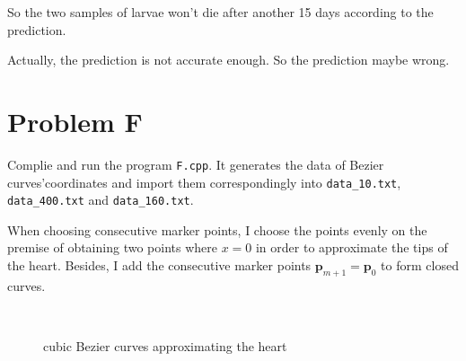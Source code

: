 \documentclass[a4paper]{article}
\begin{document}
So the two samples of larvae won't die after another 15 days according to the prediction.

Actually, the prediction is not accurate enough. So the prediction maybe wrong. 

\section*{Problem F}
Complie and run the program \verb|F.cpp|. It generates the data of Bezier curves'coordinates and import them correspondingly into \verb|data_10.txt|, \verb|data_400.txt| and \verb|data_160.txt|. 

When choosing consecutive marker points, I choose the points evenly on the premise of obtaining two points where $x=0$ in order to approximate the tips of the heart. Besides, I add the consecutive marker points $\mathbf{p}_{m+1}=\mathbf{p}_{0}$ to form closed curves.
\begin{figure}[htbp]
  \centering
  \\
  \renewcommand{\figurename}{Fig.}
  \caption{cubic Bezier curves approximating the heart}
  \label{fig4}
\end{figure}
\end{document}
